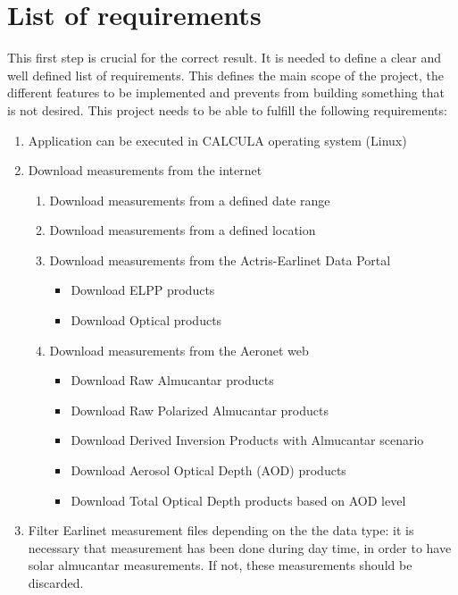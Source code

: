 \section{List of requirements}
{This first step is crucial for the correct result. It is needed to define a clear and well defined list of requirements. This defines the main scope of the project, the different features to be implemented and prevents from building something that is not desired. }
\smallskip
{This project needs to be able to fulfill the following requirements: }
\begin{enumerate} 
    \item {Application can be executed in CALCULA operating system (Linux)}
    \item {Download measurements from the internet}
    \begin{enumerate}
      \item {Download measurements from a defined date range}
      \item {Download measurements from a defined location}
      \item {Download measurements from the Actris-Earlinet Data Portal \cite{earlinet_web}}
      \begin{itemize}
        \item {Download ELPP products} %
        \item {Download Optical products}
      \end{itemize}
      \item {Download measurements from the Aeronet web \cite{aeronet_web}}
      \begin{itemize} %
        \item {Download Raw Almucantar products}
        \item {Download Raw Polarized Almucantar products}
        \item {Download Derived Inversion Products with Almucantar scenario}
        \item {Download Aerosol Optical Depth (AOD) products}
        \item {Download Total Optical Depth products based on AOD level}
      \end{itemize}
    \end{enumerate}
    \item {Filter Earlinet measurement files depending on the the data type: it is necessary that measurement has been done during day time, in order to have solar almucantar measurements. If not, these measurements should be discarded.}

\end{enumerate}
